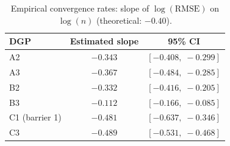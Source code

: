 \clearpage
\begin{table}[p]
\centering
\caption{Empirical convergence rates: slope of
$\log(\mathrm{RMSE})$ on $\log(n)$ (theoretical: $-0.40$).}
\label{tab:rates}
\begin{tabular}{lcc}
\toprule
DGP & Estimated slope & 95\% CI\\
\midrule
A2 & $-0.343$ & $[-0.408,\;-0.299]$\\
A3 & $-0.367$ & $[-0.484,\;-0.285]$\\
B2 & $-0.332$ & $[-0.416,\;-0.205]$\\
B3 & $-0.112$ & $[-0.166,\;-0.085]$\\
C1 (barrier 1) & $-0.481$ & $[-0.637,\;-0.346]$\\
C3 & $-0.489$ & $[-0.531,\;-0.468]$\\
\bottomrule
\end{tabular}
\end{table}

